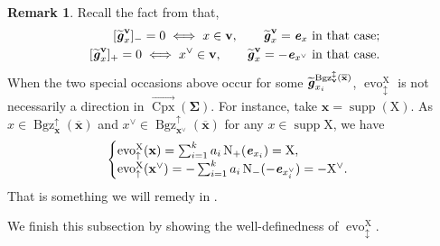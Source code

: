 \documentclass[11pt,reqno]{amsart}
\theoremstyle{plain}
\theoremstyle{definition}
\newtheorem{remark}[theorem]{Remark}
\numberwithin{equation}{section}
\newcommand\<{\langle}
\renewcommand\>{\rangle}
\newcommand{\on}[1]{\operatorname{#1}}
\def\CCx{\on{Cpx}}   %
\def\vv{\mathbf{v}}
\def\sink{X}
\newcommand{\flowd}[1]{\on{evo}^{#1}_{\downarrow}}
\newcommand{\flowu}[1]{\on{evo}^{#1}_{\uparrow}}
\newcommand{\flowdu}[1]{\on{evo}_{\updownarrow}^{#1}}
\newcommand{\ccpt}[1]{\mathrm{#1}}%
\def\xevo{\ccpt{X}}%
\newcommand{\bfit}[1]{\textbf{\textit{#1}}}
\newcommand{\ubf}[1]{\underline{\mathbf{#1}}}
\def\seeds{\mathbf{\Sigma}}
\def\xx{\mathbf{x}}%
\def\gvec{\bfit{g}}
\def\Cmat{{C}}
\def\coex{a}
\def\supp{\on{supp}}
\def\opstar{\diamond}
\newcommand{\Bgzp}[2]{\operatorname{Bgz}^{\uparrow}_{#2}(#1)}
\newcommand{\Bgzm}[2]{\operatorname{Bgz}^{\downarrow}_{#2}(#1)}
\newcommand{\Bgzpm}[2]{\operatorname{Bgz}^{\updownarrow}_{#2}(#1)}
\newcommand{\ol}[1]{\overline{#1}}
\newcommand{\DT}[1]{#1^{\vee}}
\def\dCpx{\overrightarrow{\CCx}}
\def\normal{\on{N}}
\def\tgvec{\widetilde{\gvec}}
\begin{document}
\begin{remark}\label{rem:dege-evo}
Recall the fact from \cite[\S2.7]{Nak} that,
\begin{align}\label{eq:g=e}
[\widetilde{\gvec}^{\vv}_x]_- =0
 \iff x\in\vv,\qquad \widetilde{\gvec}^{\vv}_x=\bfit e_x\ \text{in that case};\\
\label{eq:g=-e}
[\widetilde{\gvec}^{\vv}_x]_+ =0
 \iff \DT{x}\in\vv,\qquad
 \widetilde{\gvec}^{\vv}_x=-\bfit e_{\DT{x}}\ \text{in that case}.
\end{align}
When the two special occasions above occur for some $\tgvec^{\Bgzpm{\ol{\xx}}{\vv}}_{x_i}$, 
$\flowdu{\xevo}$ is not necessarily a direction in $\dCpx(\seeds)$.
For instance, take $\xx=\supp(\xevo)$.
As $x\in\Bgzp{\ol\xx}{\xx}$ and $\DT{x}\in\Bgzp{\ol\xx}{\DT{\xx}}$ for any $x\in\supp\xevo$, we have
\begin{gather}\label{eq:ex-starX}
\begin{cases}
  \flowu{\xevo}(\xx)=\sum_{i=1}^k a_i \normal_+(\bfit{e}_{x_i})=\xevo,\\  
  \flowu{\xevo}(\DT{\xx})=-\sum_{i=1}^k a_i \normal_-(-\bfit{e}_{\DT{x_i}})=-\DT{\xevo}.
\end{cases}
\end{gather}
That is something we will remedy in .
\end{remark}

We finish this subsection by showing the well-definedness of $\flowdu{\xevo}$.
\end{document}
